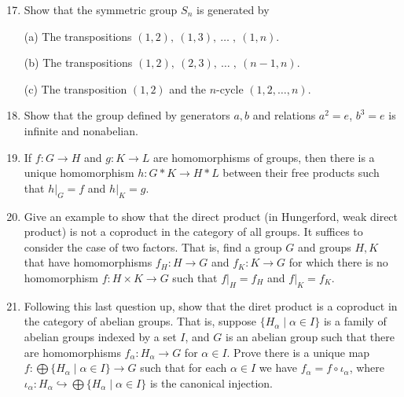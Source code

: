 \documentclass[12pt]{article}
\begin{document}
\begin{enumerate}
\setcounter{enumi}{16}


\item  Show that the symmetric group $S_n$ is generated by

  (a) The transpositions $(1,2),\ (1,3),\ \dotsc\; ,\ (1,n)$.

  (b) The transpositions $(1,2),\ (2,3),\ \dotsc\; ,\ (n{-}1,n)$.

  (c) The transposition $(1,2)$ and the $n$-cycle $(1,2,\dotsc,n)$.

       
\item   Show that the group defined by generators $a,b$ and relations $a^2=e$, $b^3=e$ is infinite and nonabelian.
       
       
\item If $f\colon G\to H$ and $g\colon K\to L$ are homomorphisms of groups, then there is a unique homomorphism
  $h\colon G * K \to H*L$ between their free products such that $h|_G=f$ and $h|_K=g$.
       
\item  Give an example to show that the direct product (in Hungerford, weak direct product) is not a coproduct in the
       category of all groups.
       It suffices to consider the case of two factors.
       That is, find a group $G$ and groups $H,K$ that have homomorphisms
       $f_H\colon H\to G$ and $f_K\colon K\to G$ for which there is no homomorphism
       $f\colon H\times K \to G$ such that $f|_H = f_H$ and  $f|_K = f_K$.


% 
\item  Following this last question up, show that the diret product is a coproduct in the category of abelian groups.  
       That is, suppose $\{H_\alpha\mid \alpha\in I\}$ is a family of abelian groups indexed by a set $I$,
       and $G$ is an abelian group such that there are homomorphisms $f_\alpha\colon H_\alpha\to G$ for $\alpha\in I$.
       Prove there is a unique map $f\colon \bigoplus\{H_\alpha\mid \alpha\in I\}\to G$ such that for each $\alpha\in I$
       we have $f_\alpha=f\circ \iota_\alpha$, where 
       $\iota_\alpha\colon H_\alpha\hookrightarrow \bigoplus\{H_\alpha\mid \alpha\in I\}$
       is the canonical injection.


\end{enumerate}
\end{document}
